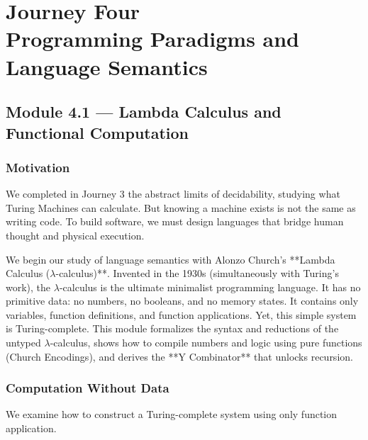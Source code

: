 \documentclass[12pt, a4paper]{book}
\begin{document}
\setcounter{chapter}{3}
\chapter[Journey 4 --- Programming Paradigms and Language Semantics]
        {Journey Four\\[8pt]
         \textcolor{ModuleColor}{\large Programming Paradigms and Language Semantics}}
\setcounter{section}{0}

\section{Module 4.1 --- Lambda Calculus and Functional Computation}
\label{sec:mod4.1}

\subsection*{Motivation}

We completed in Journey 3 the abstract limits of decidability, studying what Turing Machines can calculate.
But knowing a machine exists is not the same as writing code.
To build software, we must design languages that bridge human thought and physical execution.

We begin our study of language semantics with Alonzo Church's **Lambda Calculus ($\lambda$-calculus)**.
Invented in the 1930s (simultaneously with Turing's work), the $\lambda$-calculus is the ultimate minimalist programming language.
It has no primitive data: no numbers, no booleans, and no memory states. It contains only variables, function definitions, and function applications.
Yet, this simple system is Turing-complete.
This module formalizes the syntax and reductions of the untyped $\lambda$-calculus, shows how to compile numbers and logic using pure functions (Church Encodings), and derives the **Y Combinator** that unlocks recursion.

\subsection{Computation Without Data}

We examine how to construct a Turing-complete system using only function application.
\end{document}

